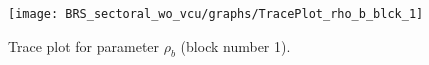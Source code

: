 \begin{figure}[H]
\centering
  \texttt{[image: BRS\_sectoral\_wo\_vcu/graphs/TracePlot\_rho\_b\_blck\_1]}\\
    \caption{Trace plot for parameter ${\rho_b}$ (block number 1).}
\end{figure}
